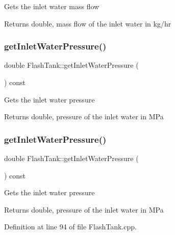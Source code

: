 Gets the inlet water mass flow \begin{DoxyReturn}{Returns}
double, mass flow of the inlet water in kg/hr 
\end{DoxyReturn}
\mbox{\label{class_flash_tank_a62e8ff97d91da0845526c494022e41da}} 
\subsubsection{\texorpdfstring{get\+Inlet\+Water\+Pressure()}{getInletWaterPressure()}\hspace{0.1cm}{\footnotesize\ttfamily [1/3]}}
{\footnotesize\ttfamily double Flash\+Tank\+::get\+Inlet\+Water\+Pressure (\begin{DoxyParamCaption}{ }\end{DoxyParamCaption}) const}

Gets the inlet water pressure \begin{DoxyReturn}{Returns}
double, pressure of the inlet water in M\+Pa 
\end{DoxyReturn}
\mbox{\label{class_flash_tank_a62e8ff97d91da0845526c494022e41da}} 
\subsubsection{\texorpdfstring{get\+Inlet\+Water\+Pressure()}{getInletWaterPressure()}\hspace{0.1cm}{\footnotesize\ttfamily [2/3]}}
{\footnotesize\ttfamily double Flash\+Tank\+::get\+Inlet\+Water\+Pressure (\begin{DoxyParamCaption}{ }\end{DoxyParamCaption}) const}

Gets the inlet water pressure \begin{DoxyReturn}{Returns}
double, pressure of the inlet water in M\+Pa 
\end{DoxyReturn}


Definition at line 94 of file Flash\+Tank.\+cpp.

\mbox{\label{class_flash_tank_a62e8ff97d91da0845526c494022e41da}} 
